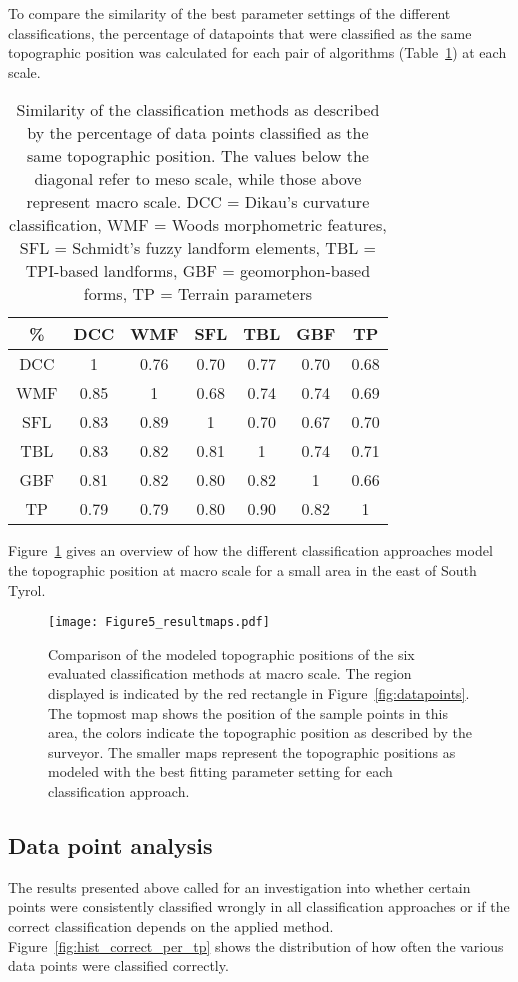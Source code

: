 \documentclass[preprint,12pt,authoryear]{elsarticle}
\begin{document}
To compare the similarity of the best parameter settings of the different classifications, the percentage of datapoints that were classified as the same topographic position was calculated for each pair of algorithms (Table~\ref{table:similarity_matrix}) at each scale. 
\begin{table}[ht]
\caption{Similarity of the classification methods as described by the percentage of data points classified as the same topographic position. The values below the diagonal refer to meso scale, while those above represent macro scale. DCC = Dikau's curvature classification, WMF = Woods morphometric features, SFL = Schmidt's fuzzy landform elements, TBL = TPI-based landforms, GBF = geomorphon-based forms, TP = Terrain parameters}
\centering
\begin{tabular}{ccccccc}
  \hline
\%  & DCC & WMF &SFL &TBL & GBF & TP \\ 
  \hline
DCC &1 & 0.76 & 0.70 & 0.77 & 0.70 & 0.68 \\ 
WMF &0.85  & 1 & 0.68 & 0.74 & 0.74 & 0.69 \\ 
SFL & 0.83 & 0.89 & 1 & 0.70 & 0.67 & 0.70 \\ 
TBL & 0.83 &0.82  &0.81  & 1 & 0.74 & 0.71 \\ 
GBF &0.81  &0.82  & 0.80  & 0.82 & 1 & 0.66 \\ 
TP &0.79  &0.79  &0.80  &0.90  &0.82  & 1 \\ 
   \hline
\end{tabular}
\label{table:similarity_matrix}
\end{table}
Figure~\ref{fig:resultmaps} gives an overview of how the different classification approaches model the topographic position at macro scale for a small area in the east of South Tyrol.
\begin{figure}
\texttt{[image: Figure5\_resultmaps.pdf]}
\caption{Comparison of the modeled topographic positions of the six evaluated classification methods at macro scale. The region displayed is indicated by the red rectangle in Figure~\ref{fig:datapoints}. The topmost map shows the position of the sample points in this area, the colors indicate the topographic position as described by the surveyor. The smaller maps represent the topographic positions as modeled with the best fitting parameter setting for each classification approach.}
\label{fig:resultmaps}
\end{figure}

\subsection{Data point analysis} 
The results presented above called for an investigation into whether certain points were consistently classified wrongly in all classification approaches or if the correct classification depends on the applied method. Figure~\ref{fig:hist_correct_per_tp} shows the distribution of how often the various data points were classified correctly.
\end{document}
